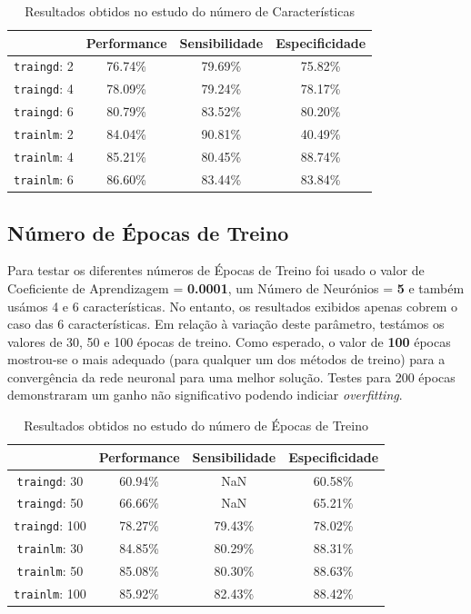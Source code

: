 \documentclass{article}
\begin{document}
\begin{table}[!h]
\centering
	\caption{Resultados obtidos no estudo do número de Características}
	\label{table_features}
	\begin{tabular}{|c|c|c|c|}
	\hline 
	 & \textbf{Performance} & \textbf{Sensibilidade} & \textbf{Especificidade} \\ 
	\hline 
	\texttt{traingd}: 2 & 76.74\%  & 79.69\% & 75.82\% \\
	\hline 
	\texttt{traingd}: 4 & 78.09\% & 79.24\% & 78.17\% \\
	\hline 
	\texttt{traingd}: 6 & 80.79\% & 83.52\% & 80.20\% \\
	\hline
	\texttt{trainlm}: 2 & 84.04\%  & 90.81\% & 40.49\% \\
	\hline 
	\texttt{trainlm}: 4 & 85.21\% & 80.45\% & 88.74\% \\
	\hline 
	\texttt{trainlm}: 6 & 86.60\% & 83.44\% & 83.84\% \\

	\hline    
	\end{tabular}
\end{table}

\subsection{Número de Épocas de Treino}
\indent \indent Para testar os diferentes números de Épocas de Treino foi usado o valor de Coeficiente de Aprendizagem = \textbf{0.0001}, um Número de Neurónios = \textbf{5} e também usámos 4 e 6 características. No entanto, os resultados exibidos apenas cobrem o caso das 6 características. Em relação à variação deste parâmetro, testámos os valores de 30, 50 e 100 épocas de treino. Como esperado, o valor de \textbf{100} épocas mostrou-se o mais adequado (para qualquer um dos métodos de treino) para a convergência da rede neuronal para uma melhor solução. Testes para 200 épocas demonstraram um ganho não significativo podendo indiciar \textit{overfitting}.


\begin{table}[!h]
\centering
	\caption{Resultados obtidos no estudo do número de Épocas de Treino}
	\label{table_epochs}
	\begin{tabular}{|c|c|c|c|}
	\hline 
	 & \textbf{Performance} & \textbf{Sensibilidade} & \textbf{Especificidade} \\ 
	\hline 
	\texttt{traingd}: 30 & 60.94\%  & NaN & 60.58\% \\
	\hline 
	\texttt{traingd}: 50 & 66.66\% & NaN & 65.21\% \\
	\hline 
	\texttt{traingd}: 100 & 78.27\% & 79.43\% & 78.02\% \\
	\hline
	\texttt{trainlm}: 30 & 84.85\%  & 80.29\% & 88.31\% \\ 
	\hline 
	\texttt{trainlm}: 50 & 85.08\% & 80.30\% & 88.63\% \\
	\hline 
	\texttt{trainlm}: 100 & 85.92\% & 82.43\% & 88.42\% \\

	\hline    
	\end{tabular}
\end{table}
\end{document}
